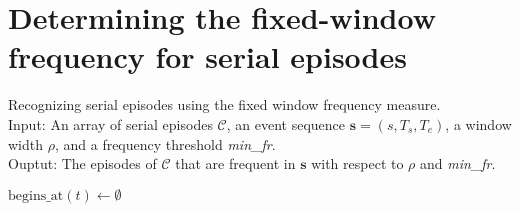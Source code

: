 \section{Determining the fixed-window frequency for serial episodes}

\begin{algorithm}

\caption{Recognizing serial episodes using the fixed window frequency measure. \\
Input: An array of serial episodes $ \mathcal{C} $, an event sequence $ \boldsymbol{s} = (s, T_s, T_e) $, a window width $ \rho $, and a frequency threshold \textit{min\_fr}. \\
Ouptut: The episodes of $ \mathcal{C} $ that are frequent in $ \boldsymbol{s} $ with respect to $ \rho $ and \textit{min\_fr}.
}

\begin{algorithmic}[1]

 
    \EndFor
\EndFor

     \label{alglin:rec-ser-fwi:fill-waits-init}
\EndFor

 $ \text{begins\_at}(t) \leftarrow \emptyset $
\EndFor


\end{algorithmic}
\end{algorithm}
